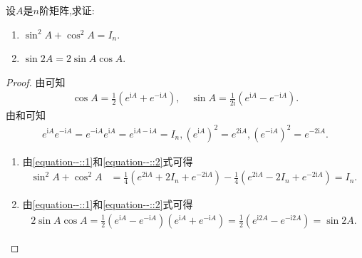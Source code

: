 \documentclass[../../main.tex]{subfiles}%
\begin{document}
\begin{proposition}[矩阵三角函数的性质]\label{proposition:矩阵三角函数的性质}
设$A$是$n$阶矩阵,求证:
\begin{enumerate}[(1)]
\item  $\sin^2 A+\cos^2 A = I_n$.

\item $\sin 2A = 2\sin A\cos A$.
\end{enumerate}
\end{proposition}
\begin{proof}
由可知
\begin{align}\label{equation--::1}
\cos A = \frac{1}{2}(e^{\mathrm{i}A}+e^{-\mathrm{i}A}),
\quad
\sin A = \frac{1}{2\mathrm{i}}(e^{\mathrm{i}A}-e^{-\mathrm{i}A}).
\end{align}
由和可知
\begin{align}\label{equation--::2}
e^{\mathrm{i}A}e^{-\mathrm{i}A}=e^{-\mathrm{i}A}e^{\mathrm{i}A}=e^{\mathrm{i}A - \mathrm{i}A}=I_n,(e^{\mathrm{i}A})^2 = e^{2\mathrm{i}A},(e^{-\mathrm{i}A})^2 = e^{-2\mathrm{i}A}.
\end{align}
\begin{enumerate}[(1)]
\item 由\eqref{equation--::1}和\eqref{equation--::2}式可得
\begin{align*}
\sin^2 A+\cos^2 A &= \frac{1}{4}(e^{2\mathrm{i}A}+2I_n + e^{-2\mathrm{i}A}) - \frac{1}{4}(e^{2\mathrm{i}A}-2I_n + e^{-2\mathrm{i}A}) = I_n.
\end{align*}

\item 由\eqref{equation--::1}和\eqref{equation--::2}式可得
\begin{align*}
2\sin A\cos A=\frac{1}{2}\left( e^{\mathrm{i}A}-e^{-\mathrm{i}A} \right) \left( e^{\mathrm{i}A}+e^{-\mathrm{i}A} \right) =\frac{1}{2}\left( e^{\mathrm{i}2A}-e^{-\mathrm{i}2A} \right) =\sin 2A.    
\end{align*}
\end{enumerate}
\end{proof}
\end{document}
